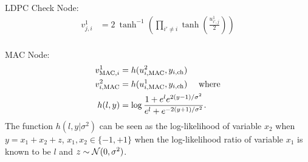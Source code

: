 LDPC Check Node:
\begin{align*}
v^{1}_{j,i}&=2~\tanh^{-1}\left( \prod_{i'\neq i} \tanh\left(\frac{u^{1}_{i',j}}{2}\right)\right)\\
\end{align*}

MAC Node:
\begin{align}
\label{Eqn:MACnodeBP}
v^{1}_{\text{MAC},i}&=h(u^{2}_{i,\text{MAC}},y_{i,\text{ch}})\\
v^{2}_{i,\text{MAC}}&=h(u^{1}_{i,\text{MAC}},y_{i,\text{ch}}) ~~~\text{ where}\notag\\
h(l,y)&=\log \frac{1+e^{l}e^{2(y-1)/\sigma^2}}{e^{l}+e^{-2(y+1)/\sigma^2}}.\notag
\end{align}
The function $h(l,y|\sigma^2)$ can be seen as the log-likelihood of variable $x_2$ when $y=x_1+x_2+z$, $x_1,x_2\in\{-1,+1\}$ when the log-likelihood ratio of variable $x_1$ is known to be $l$ and $z\sim \mathcal{N}(0,\sigma^2)$.

